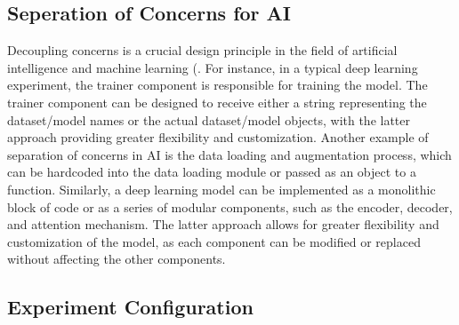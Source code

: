 \subsection{Seperation of Concerns for AI}


Decoupling concerns is a crucial design principle in the field of artificial intelligence and machine learning (\cite{mo2016decoupling,qian2006decoupling, pressman2010software}. For instance, in a typical deep learning experiment, the trainer component is responsible for training the model. The trainer component can be designed to receive either a string representing the dataset/model names or the actual dataset/model objects, with the latter approach providing greater flexibility and customization. Another example of separation of concerns in AI is the data loading and augmentation process, which can be hardcoded into the data loading module or passed as an object to a function. Similarly, a deep learning model can be implemented as a monolithic block of code or as a series of modular components, such as the encoder, decoder, and attention mechanism. The latter approach allows for greater flexibility and customization of the model, as each component can be modified or replaced without affecting the other components.




\subsection{Experiment Configuration}

